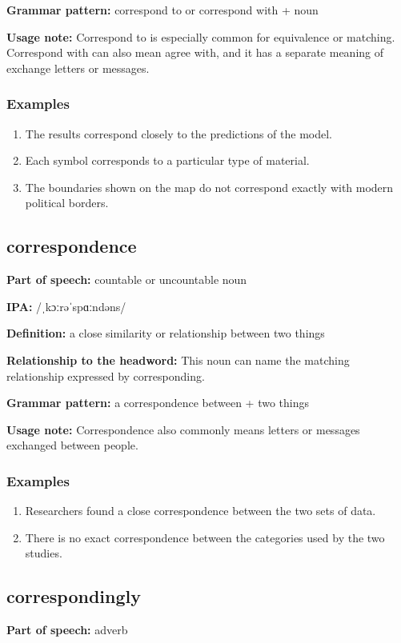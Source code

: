 \documentclass[11pt]{article}
\begin{document}
\textbf{Grammar pattern:} correspond to or correspond with + noun

\textbf{Usage note:} Correspond to is especially common for equivalence or matching. Correspond with can also mean agree with, and it has a separate meaning of exchange letters or messages.

\subsubsection{Examples}
\begin{enumerate}
  \item The results correspond closely to the predictions of the model.
  \item Each symbol corresponds to a particular type of material.
  \item The boundaries shown on the map do not correspond exactly with modern political borders.
\end{enumerate}

\subsection{correspondence}
\textbf{Part of speech:} countable or uncountable noun

\textbf{IPA:} /ˌkɔːrəˈspɑːndəns/

\textbf{Definition:} a close similarity or relationship between two things

\textbf{Relationship to the headword:} This noun can name the matching relationship expressed by corresponding.

\textbf{Grammar pattern:} a correspondence between + two things

\textbf{Usage note:} Correspondence also commonly means letters or messages exchanged between people.

\subsubsection{Examples}
\begin{enumerate}
  \item Researchers found a close correspondence between the two sets of data.
  \item There is no exact correspondence between the categories used by the two studies.
\end{enumerate}

\subsection{correspondingly}
\textbf{Part of speech:} adverb
\end{document}
